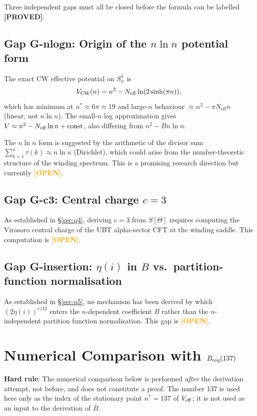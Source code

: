 \documentclass[12pt,a4paper]{article}
\theoremstyle{definition}
\theoremstyle{remark}
\newcommand{\PROVED}{\textcolor{green!60!black}{\textbf{[PROVED]}}}
\newcommand{\OPEN}{\textcolor{orange}{\textbf{[OPEN]}}}
\newcommand{\Neff}{N_{\mathrm{eff}}}
\begin{document}
Three independent gaps must all be closed before the formula can be labelled
\PROVED.

\subsection{Gap G-nlogn: Origin of the $n\ln n$ potential form}

The exact CW effective potential on $S^1_\psi$ is
\[
  V_{\rm CW}(n) = n^2 - \Neff\ln(2\sinh(\pi n)),
\]
which has minimum at $n^* \approx 6\pi \approx 19$ and large-$n$ behaviour
$\approx n^2 - \pi\Neff n$ (linear, not $n\ln n$).  The small-$n$ log
approximation gives $V \approx n^2 - \Neff\ln n + {\rm const}$, also
differing from $n^2 - Bn\ln n$.

The $n\ln n$ form is suggested by the arithmetic of the divisor sum
$\sum_{k=1}^n \tau(k) \approx n\ln n$ (Dirichlet), which could arise from
the number-theoretic structure of the winding spectrum.  This is a
promising research direction but currently \OPEN.

\subsection{Gap G-c3: Central charge $c = 3$}

As established in §\ref{sec:q4}, deriving $c = 3$ from $S[\Theta]$ requires
computing the Virasoro central charge of the UBT alpha-sector CFT at the
winding saddle.  This computation is \OPEN.

\subsection{Gap G-insertion: $\eta(i)$ in $B$ vs.\ partition-function normalisation}

As established in §\ref{sec:q5}, no mechanism has been derived by which
$(2\eta(i))^{c/12}$ enters the $n$-dependent coefficient $B$ rather than
the $n$-independent partition function normalisation.  This gap is \OPEN.

\section{Numerical Comparison with $B_{\rm req}(137)$}
\label{sec:eta:numerical}

\begin{warnbox}
\textbf{Hard rule}: The numerical comparison below is performed \emph{after}
the derivation attempt, not before, and does not constitute a proof.  The
number 137 is used here only as the index of the stationary point
$n^* = 137$ of $V_{\rm eff}$; it is not used as an input to the
derivation of $B$.
\end{warnbox}
\end{document}
